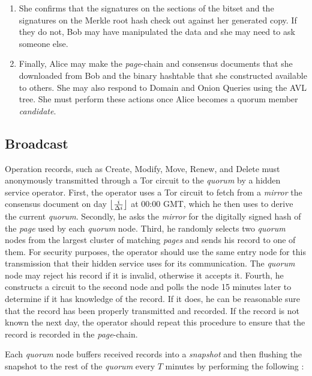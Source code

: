 \begin{enumerate}
	\item She confirms that the signatures on the sections of the bitset and the signatures on the Merkle root hash check out against her generated copy. If they do not, Bob may have manipulated the data and she may need to ask someone else.
	\item Finally, Alice may make the \emph{page}-chain and consensus documents that she downloaded from Bob and the binary hashtable that she constructed available to others. She may also respond to Domain and Onion Queries using the AVL tree. She must perform these actions once Alice becomes a quorum member \emph{candidate}.
\end{enumerate}

\subsection{Broadcast}
\label{sec:Broadcast}


Operation records, such as Create, Modify, Move, Renew, and Delete must anonymously transmitted through a Tor circuit to the \emph{quorum} by a hidden service operator. First, the operator uses a Tor circuit to fetch from a \emph{mirror} the consensus document on day $ \floor[\big]{\frac{i}{\Delta i}} $ at 00:00 GMT, which he then uses to derive the current \emph{quorum}. Secondly, he asks the \emph{mirror} for the digitally signed hash of the \emph{page} used by each \emph{quorum} node. Third, he randomly selects two \emph{quorum} nodes from the largest cluster of matching \emph{pages} and sends his record to one of them. For security purposes, the operator should use the same entry node for this transmission that their hidden service uses for its communication. The \emph{quorum} node may reject his record if it is invalid, otherwise it accepts it. Fourth, he constructs a circuit to the second node and polls the node 15 minutes later to determine if it has knowledge of the record. If it does, he can be reasonable sure that the record has been properly transmitted and recorded. If the record is not known the next day, the operator should repeat this procedure to ensure that the record is recorded in the \emph{page}-chain.

Each \emph{quorum} node buffers received records into a \emph{snapshot} and then flushing the snapshot to the rest of the \emph{quorum} every $ T $ minutes by performing the following :

